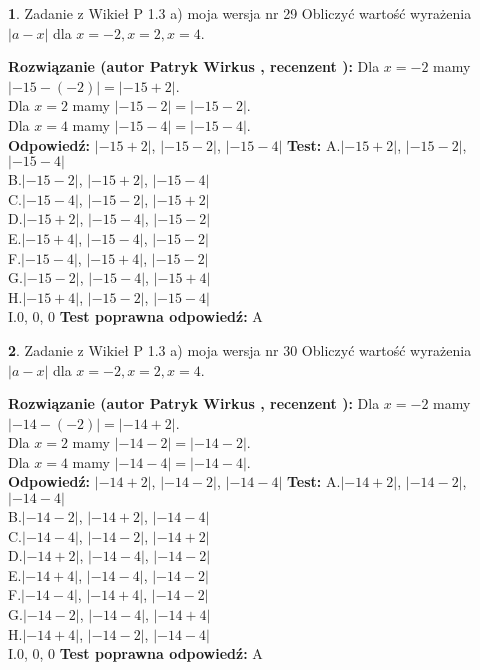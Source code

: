 \documentclass[12pt, a4paper]{article}
\theoremstyle{definition} %
\newtheorem{zad}{}
\newcommand{\zadStart}[1]{\begin{zad}#1\newline}
\newcommand{\zadStop}{\end{zad}}
\newcommand{\rozwStart}[2]{\noindent \textbf{Rozwiązanie (autor #1 , recenzent #2): }\newline}
\newcommand{\rozwStop}{\newline}
\newcommand{\odpStart}{\noindent \textbf{Odpowiedź:}\newline}
\newcommand{\odpStop}{\newline}
\newcommand{\testStart}{\noindent \textbf{Test:}\newline}
\newcommand{\testStop}{\newline}
\newcommand{\kluczStart}{\noindent \textbf{Test poprawna odpowiedź:}\newline}
\newcommand{\kluczStop}{\newline}
\begin{document}
\zadStart{Zadanie z Wikieł P 1.3 a) moja wersja nr 29}
Obliczyć wartość wyrażenia $|a - x|$ dla $x=-2,x=2,x=4$.
\zadStop
\rozwStart{Patryk Wirkus}{}
Dla $x = -2$ mamy $|-15 - (-2)| = |-15 + 2|$.\\
Dla $x = 2$ mamy $|-15 - 2| = |-15 - 2|$.\\
Dla $x = 4$ mamy $|-15 - 4| = |-15 - 4|$.\\
\rozwStop
\odpStart
$|-15 + 2|$, $|-15 - 2|$, $|-15 - 4|$
\odpStop
\testStart
A.$|-15 + 2|$, $|-15 - 2|$, $|-15 - 4|$\\
B.$|-15 - 2|$, $|-15 + 2|$, $|-15 - 4|$\\
C.$|-15 - 4|$, $|-15 - 2|$, $|-15 + 2|$\\
D.$|-15 + 2|$, $|-15 - 4|$, $|-15 - 2|$\\
E.$|-15 + 4|$, $|-15 - 4|$, $|-15 - 2|$\\
F.$|-15 - 4|$, $|-15 + 4|$, $|-15 - 2|$\\
G.$|-15 - 2|$, $|-15 - 4|$, $|-15 + 4|$\\
H.$|-15 + 4|$, $|-15 - 2|$, $|-15 - 4|$\\
I.$0$, $0$, $0$
\testStop
\kluczStart
A
\kluczStop



\zadStart{Zadanie z Wikieł P 1.3 a) moja wersja nr 30}
Obliczyć wartość wyrażenia $|a - x|$ dla $x=-2,x=2,x=4$.
\zadStop
\rozwStart{Patryk Wirkus}{}
Dla $x = -2$ mamy $|-14 - (-2)| = |-14 + 2|$.\\
Dla $x = 2$ mamy $|-14 - 2| = |-14 - 2|$.\\
Dla $x = 4$ mamy $|-14 - 4| = |-14 - 4|$.\\
\rozwStop
\odpStart
$|-14 + 2|$, $|-14 - 2|$, $|-14 - 4|$
\odpStop
\testStart
A.$|-14 + 2|$, $|-14 - 2|$, $|-14 - 4|$\\
B.$|-14 - 2|$, $|-14 + 2|$, $|-14 - 4|$\\
C.$|-14 - 4|$, $|-14 - 2|$, $|-14 + 2|$\\
D.$|-14 + 2|$, $|-14 - 4|$, $|-14 - 2|$\\
E.$|-14 + 4|$, $|-14 - 4|$, $|-14 - 2|$\\
F.$|-14 - 4|$, $|-14 + 4|$, $|-14 - 2|$\\
G.$|-14 - 2|$, $|-14 - 4|$, $|-14 + 4|$\\
H.$|-14 + 4|$, $|-14 - 2|$, $|-14 - 4|$\\
I.$0$, $0$, $0$
\testStop
\kluczStart
A
\kluczStop
\end{document}
